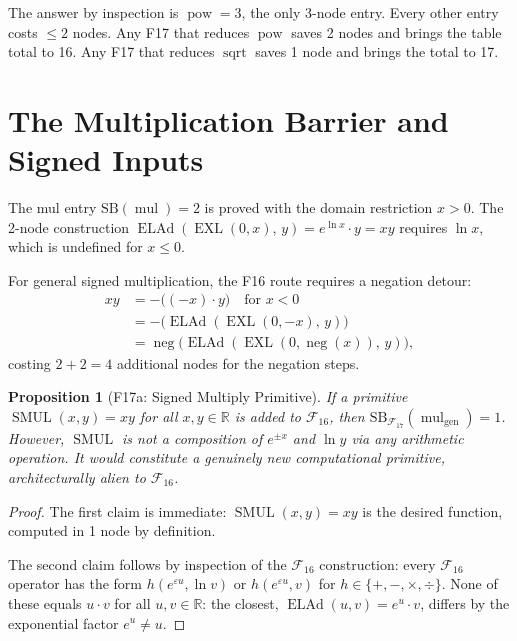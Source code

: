 \documentclass[12pt,a4paper]{article}
\newtheorem{proposition}[theorem]{Proposition}
\theoremstyle{definition}
\theoremstyle{remark}
\newcommand{\EXL}{\operatorname{EXL}}
\newcommand{\ELAd}{\operatorname{ELAd}}
\newcommand{\mulop}{\operatorname{mul}}
\newcommand{\negop}{\operatorname{neg}}
\newcommand{\powop}{\operatorname{pow}}
\newcommand{\sqrtop}{\operatorname{sqrt}}
\newcommand{\SMUL}{\operatorname{SMUL}}
\newcommand{\SB}{\mathrm{SB}}
\newcommand{\F}{\mathcal{F}_{16}}
\newcommand{\Fs}{\mathcal{F}_{17}}
\newcommand{\R}{\mathbb{R}}
\begin{document}
The answer by inspection is $\powop = 3$, the only 3-node entry.  Every
other entry costs $\le 2$ nodes.  Any F17 that reduces $\powop$ saves
2 nodes and brings the table total to 16.  Any F17 that reduces $\sqrtop$
saves 1 node and brings the total to 17.

\section{The Multiplication Barrier and Signed Inputs}
\label{sec:mul-barrier}

The mul entry $\SB(\mulop) = 2$ is proved with the domain restriction $x > 0$.
The 2-node construction $\ELAd(\EXL(0,x),\,y) = e^{\ln x}\cdot y = xy$
requires $\ln x$, which is undefined for $x \le 0$.

For general signed multiplication, the F16 route requires a negation detour:
\begin{align*}
  xy &= -\bigl((-x)\cdot y\bigr) \quad\text{for } x < 0 \\
  &= -\bigl(\ELAd(\EXL(0,-x),\,y)\bigr) \\
  &= \negop\!\bigl(\ELAd(\EXL(0,\negop(x)),\,y)\bigr),
\end{align*}
costing $2 + 2 = 4$ additional nodes for the negation steps.

\begin{proposition}[F17a: Signed Multiply Primitive]
\label{prop:smul}
If a primitive $\SMUL(x,y) = xy$ for all $x,y\in\R$ is added to $\F$,
then $\SB_{\Fs}(\mulop_{\mathrm{gen}}) = 1$.
However, $\SMUL$ is not a composition of $e^{\pm x}$ and $\ln y$ via any
arithmetic operation.  It would constitute a genuinely new computational
primitive, architecturally alien to $\F$.
\end{proposition}

\begin{proof}
The first claim is immediate: $\SMUL(x,y) = xy$ is the desired function,
computed in 1 node by definition.

The second claim follows by inspection of the $\F$ construction:
every $\F$ operator has the form $h(e^{\varepsilon u}, \ln v)$ or
$h(e^{\varepsilon u}, v)$ for $h\in\{+,-,\times,\div\}$.
None of these equals $u\cdot v$ for all $u,v\in\R$: the closest,
$\ELAd(u,v) = e^u\cdot v$, differs by the exponential factor $e^u \ne u$.
\end{proof}
\end{document}
